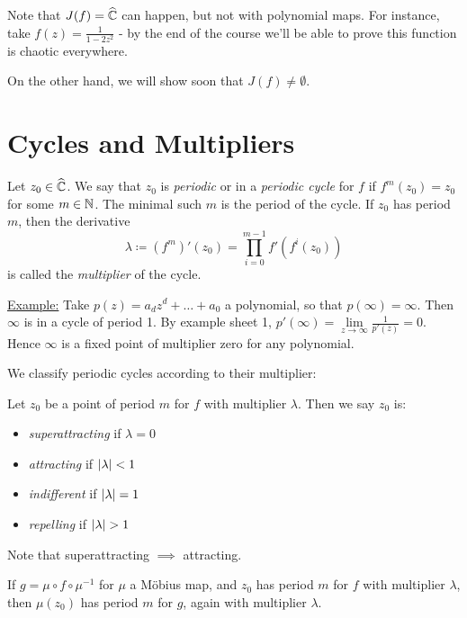 \documentclass[10pt,a4paper]{article}
\begin{document}
Note that $J(f) = \widehat{\mathbb{C}}$ can happen, but not with polynomial maps. For instance, take $f(z) = \frac{1}{1-2z^2}$ - by the end of the course we'll be able to prove this function is chaotic everywhere.

On the other hand, we will show soon that $J(f) \neq \emptyset$.

\section{Cycles and Multipliers}
\begin{definition}
  Let $z_0 \in \widehat{\mathbb{C}}$. We say that $z_0$ is \emph{periodic} or in a \emph{periodic cycle} for $f$ if $f^m(z_0) = z_0$ for some $m \in \mathbb{N}$. The minimal such $m$ is the period of the cycle. If $z_0$ has period $m$, then the derivative
  \[\lambda \coloneqq (f^m)'(z_0) = \prod_{i=0}^{m-1}f'(f^i(z_0))\]
  is called the \emph{multiplier} of the cycle.
\end{definition}
\underline{Example:} Take $p(z) = a_dz^d + \ldots + a_0$ a polynomial, so that $p(\infty) = \infty.$ Then $\infty$ is in a cycle of period 1. By example sheet 1, $p'(\infty) = \lim\limits_{z\to\infty}\frac{1}{p'(z)} = 0$. Hence $\infty$ is a fixed point of multiplier zero for any polynomial.

We classify periodic cycles according to their multiplier:
\begin{definition}
  Let $z_0$ be a point of period $m$ for $f$ with multiplier $\lambda$. Then we say $z_0$ is:
  \begin{itemize}
    \item \emph{superattracting} if $\lambda = 0$
    \item \emph{attracting} if $\lvert\lambda\rvert < 1$
    \item \emph{indifferent} if $\lvert\lambda\rvert = 1$
    \item \emph{repelling} if $\lvert\lambda\rvert > 1$
  \end{itemize}
\end{definition}
Note that superattracting $\implies$ attracting.

If $g = \mu \circ f \circ \mu^{-1}$ for $\mu$ a M\"obius map, and $z_0$ has period $m$ for $f$ with multiplier $\lambda$, then $\mu(z_0)$ has period $m$ for $g$, again with multiplier $\lambda$.
\end{document}
